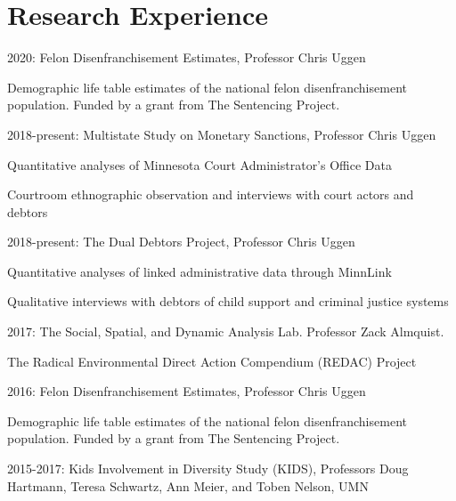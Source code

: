 \documentclass[letterpaper]{article}
\renewenvironment{itemize}{
  \begin{list}{}{
    \setlength{\leftmargin}{1.5em}
  }
}{
  \end{list}
}
\begin{document}
\section*{\textbf{Research Experience}}
\begin{itemize}

\item 2020: Felon Disenfranchisement Estimates, Professor Chris Uggen
	\begin{itemize}
	\item Demographic life table estimates of the national felon disenfranchisement population. Funded by a grant from The Sentencing Project. 
	\end{itemize}
\item 2018-present: Multistate Study on Monetary Sanctions, Professor Chris Uggen
	\begin{itemize}
	\item Quantitative analyses of Minnesota Court Administrator's Office Data
	\item Courtroom ethnographic observation and interviews with court actors and debtors
	\end{itemize}
\item 2018-present: The Dual Debtors Project, Professor Chris Uggen
	\begin{itemize}
	\item Quantitative analyses of linked administrative data through MinnLink
	\item Qualitative interviews with debtors of child support and criminal justice systems
	\end{itemize}
\item 2017: The Social, Spatial, and Dynamic Analysis Lab. Professor Zack Almquist. 
	\begin{itemize}
	\item The Radical Environmental Direct Action Compendium (REDAC) Project
	\end{itemize}
\item 2016:  Felon Disenfranchisement Estimates, Professor Chris Uggen
	\begin{itemize}
	\item Demographic life table estimates of the national felon disenfranchisement population. Funded by a grant from The Sentencing Project. 
	\end{itemize}
\item 2015-2017:  Kids Involvement in Diversity Study (KIDS), Professors Doug Hartmann, Teresa Schwartz,  Ann Meier, and Toben Nelson, UMN
	\begin{itemize}

\end{itemize}
\end{itemize}
\end{document}
